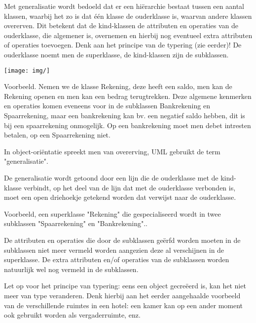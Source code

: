 
Met generalisatie wordt bedoeld dat er een hiërarchie bestaat tussen een aantal klassen, waarbij het zo is dat één klasse de ouderklasse is, waarvan andere klassen overerven. Dit betekent dat de kind-klassen de attributen en operaties van de ouderklasse, die algemener is, overnemen en hierbij nog eventueel extra attributen of operaties toevoegen. Denk aan het principe van de typering (zie eerder)! De ouderklasse noemt men de superklasse, de kind-klassen zijn de subklassen.


\begin{center}
\texttt{[image: img/]}%
\label{labelname}%
\end{center}

Voorbeeld. Nemen we de klasse Rekening, deze heeft een saldo, men kan de Rekening openen en men kan een bedrag terugtrekken. Deze algemene kenmerken en operaties komen eveneens voor in de subklassen Bankrekening en Spaarrekening, maar een bankrekening kan bv. een negatief saldo hebben, dit is bij een spaarrekening onmogelijk. Op een bankrekening moet men debet intresten betalen, op een Spaarrekening niet.

In object-oriëntatie spreekt men van overerving, UML gebruikt de term "generalisatie".

De generalisatie wordt getoond door een lijn die de ouderklasse met de kind- klasse verbindt, op het deel van de lijn dat met de ouderklasse verbonden is, moet een open driehoekje getekend worden dat verwijst naar de ouderklasse.

Voorbeeld, een superklasse "Rekening" die gespecialiseerd wordt in twee subklassen "Spaarrekening" en "Bankrekening"..

De attributen en operaties die door de subklassen geërfd worden moeten in de subklassen niet meer vermeld worden aangezien deze al verschijnen in de superklasse. De extra attributen en/of operaties van de subklassen worden natuurlijk wel nog vermeld in de subklassen.

Let op voor het principe van typering: eens een object gecreëerd is, kan het niet meer van type veranderen. Denk hierbij aan het eerder aangehaalde voorbeeld van de verschillende ruimtes in een hotel: een kamer kan op een ander moment ook gebruikt worden als vergaderruimte, enz.


